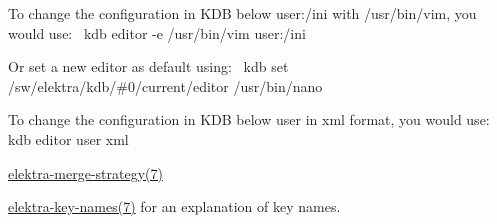 To change the configuration in K\+DB below {\ttfamily user\+:/ini} with {\ttfamily /usr/bin/vim}, you would use\+:~\newline
 {\ttfamily kdb editor -\/e /usr/bin/vim user\+:/ini}

Or set a new editor as default using\+:~\newline
 {\ttfamily kdb set /sw/elektra/kdb/\#0/current/editor /usr/bin/nano}

To change the configuration in K\+DB below {\ttfamily user} in xml format, you would use\+:~\newline
 {\ttfamily kdb editor user xml}


\begin{DoxyItemize}
\item \hyperlink{doc_help_elektra-merge-strategy_md}{elektra-\/merge-\/strategy(7)}
\item \hyperlink{doc_help_elektra-key-names_md}{elektra-\/key-\/names(7)} for an explanation of key names. 
\end{DoxyItemize}